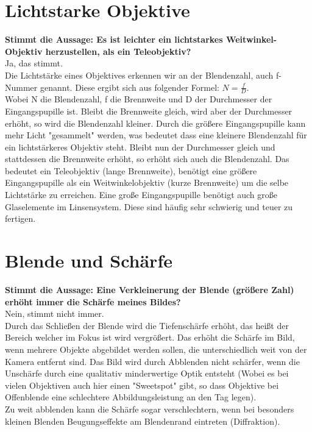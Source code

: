 \documentclass[a4paper]{article}
\begin{document}
\newpage

	\section{Lichtstarke Objektive}
	\textbf{Stimmt die Aussage: Es ist leichter ein lichtstarkes Weitwinkel-Objektiv herzustellen, als ein Teleobjektiv?}\\
	Ja, das stimmt.\\
	Die Lichtstärke eines Objektives erkennen wir an der Blendenzahl, auch f-Nummer genannt. Diese ergibt sich aus folgender Formel: $N = \frac{f}{D}$.\\
	Wobei N die Blendenzahl, f die Brennweite und D der Durchmesser der Eingangspupille ist. Bleibt die Brennweite gleich, wird aber der Durchmesser erhöht, so wird die Blendenzahl kleiner. Durch die größere Eingangspupille kann mehr Licht "gesammelt" werden, was bedeutet dass eine kleinere Blendenzahl für ein lichtstärkeres Objektiv steht. Bleibt nun der Durchmesser gleich und stattdessen die Brennweite erhöht, so erhöht sich auch die Blendenzahl. Das bedeutet ein Teleobjektiv (lange Brennweite), benötigt eine größere Eingangspupille als ein Weitwinkelobjektiv (kurze Brennweite) um die selbe Lichtstärke zu erreichen. Eine große Eingangspupille benötigt auch große Glaselemente im Linsensystem. Diese sind häufig sehr schwierig und teuer zu fertigen.\\
	
	\section{Blende und Schärfe}
	\textbf{Stimmt die Aussage: Eine Verkleinerung der Blende (größere Zahl) erhöht immer die Schärfe meines Bildes?}\\
	Nein, stimmt nicht immer.\\
	Durch das Schließen der Blende wird die Tiefenschärfe erhöht, das heißt der Bereich welcher im Fokus ist wird vergrößert. Das erhöht die Schärfe im Bild, wenn mehrere Objekte abgebildet werden sollen, die unterschiedlich weit von der Kamera entfernt sind. Das Bild wird durch Abblenden nicht schärfer, wenn die Unschärfe durch eine qualitativ minderwertige Optik entsteht (Wobei es bei vielen Objektiven auch hier einen "Sweetspot" gibt, so dass Objektive bei Offenblende eine schlechtere Abbildungsleistung an den Tag legen).\\
	Zu weit abblenden kann die Schärfe sogar verschlechtern, wenn bei besonders kleinen Blenden Beugungseffekte am Blendenrand eintreten (Diffraktion).\\
	
\end{document}
